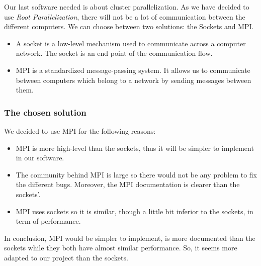 Our last software needed is about cluster parallelization. As we have decided to use \textit{Root Parallelization}, there will not be a lot of communication between the different computers. We can choose between two solutions: the Sockets and MPI.
\begin{itemize}
\item A socket is  a low-level mechanism used to communicate across a computer network. The socket is an end point of the communication flow.
\item MPI is a standardized message-passing system. It allows us to communicate between computers which belong to a network by sending messages between them. 
\end{itemize}
\subsubsection{The chosen solution}

We decided to use MPI for the following reasons:
\begin{itemize}
\item MPI is more high-level than the sockets, thus it will be simpler to implement in our software.
\item The community behind MPI is large so there would not be any problem to fix the different bugs. Moreover, the MPI documentation is clearer than the sockets'. 
\item MPI uses sockets so it is similar, though a little bit inferior to the sockets, in term of performance.
\end{itemize}
In conclusion, MPI would be simpler to implement, is more documented than the sockets while they both have almost similar performance. So, it seems more adapted to our project than the sockets.